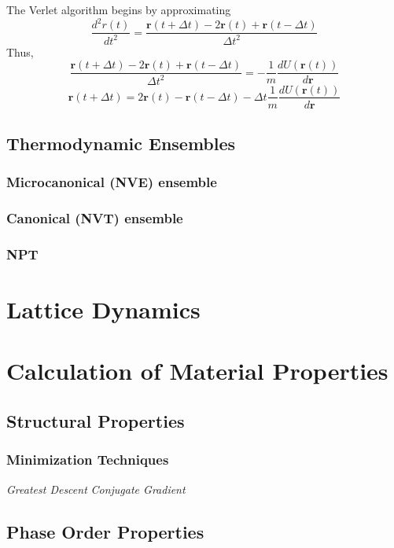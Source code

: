The Verlet algorithm begins by approximating
\begin{equation}
	\frac{d^2 r(t)}
	     {dt^2}
	= \frac{\bm{r}(t+\Delta t) - 2\bm{r}(t) + \bm{r}(t-\Delta t)}
	       {\Delta t^2}
\end{equation}
Thus,
\begin{equation}
  \frac{\bm{r}(t+\Delta t) - 2\bm{r}(t) + \bm{r}(t-\Delta t)}
	     {\Delta t^2}
	=
	- \frac{1}{m} \frac{dU(\bm{r}(t))}{d\bm{r}}
\end{equation}
\begin{equation}
	\bm{r}(t+\Delta t)
	     = 2\bm{r}(t) - \bm{r}(t-\Delta t) - \Delta t \frac{1}{m} \frac{dU(\bm{r}(t))}{d\bm{r}}
\end{equation}


\subsection{Thermodynamic Ensembles}
\subsubsection{Microcanonical (NVE) ensemble}
\subsubsection{Canonical (NVT) ensemble}
\subsubsection{NPT}
\section{Lattice Dynamics}
\section{Calculation of Material Properties}
\subsection{Structural Properties}
\subsubsection{Minimization Techniques}
\emph{Greatest Descent}
\emph{Conjugate Gradient}
\subsection{Phase Order Properties}
